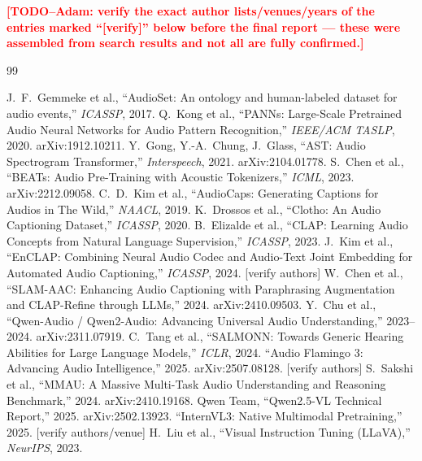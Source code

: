 \documentclass[11pt,a4paper]{article}
\newcommand{\TODO}[1]{\textcolor{red}{\textbf{[TODO--Adam: #1]}}}
\begin{document}
\noindent\TODO{verify the exact author lists/venues/years of the entries marked ``[verify]'' below before the final report --- these were assembled from search results and not all are fully confirmed.}\par\smallskip

\begin{thebibliography}{99}

 J.\ F.\ Gemmeke et al., ``AudioSet: An ontology and human-labeled dataset for audio events,'' \emph{ICASSP}, 2017.
 Q.\ Kong et al., ``PANNs: Large-Scale Pretrained Audio Neural Networks for Audio Pattern Recognition,'' \emph{IEEE/ACM TASLP}, 2020. arXiv:1912.10211.
 Y.\ Gong, Y.-A.\ Chung, J.\ Glass, ``AST: Audio Spectrogram Transformer,'' \emph{Interspeech}, 2021. arXiv:2104.01778.
 S.\ Chen et al., ``BEATs: Audio Pre-Training with Acoustic Tokenizers,'' \emph{ICML}, 2023. arXiv:2212.09058.
 C.\ D.\ Kim et al., ``AudioCaps: Generating Captions for Audios in The Wild,'' \emph{NAACL}, 2019.
 K.\ Drossos et al., ``Clotho: An Audio Captioning Dataset,'' \emph{ICASSP}, 2020.
 B.\ Elizalde et al., ``CLAP: Learning Audio Concepts from Natural Language Supervision,'' \emph{ICASSP}, 2023.
 J.\ Kim et al., ``EnCLAP: Combining Neural Audio Codec and Audio-Text Joint Embedding for Automated Audio Captioning,'' \emph{ICASSP}, 2024. [verify authors]
 W.\ Chen et al., ``SLAM-AAC: Enhancing Audio Captioning with Paraphrasing Augmentation and CLAP-Refine through LLMs,'' 2024. arXiv:2410.09503.
 Y.\ Chu et al., ``Qwen-Audio / Qwen2-Audio: Advancing Universal Audio Understanding,'' 2023--2024. arXiv:2311.07919.
 C.\ Tang et al., ``SALMONN: Towards Generic Hearing Abilities for Large Language Models,'' \emph{ICLR}, 2024.
 ``Audio Flamingo 3: Advancing Audio Intelligence,'' 2025. arXiv:2507.08128. [verify authors]
 S.\ Sakshi et al., ``MMAU: A Massive Multi-Task Audio Understanding and Reasoning Benchmark,'' 2024. arXiv:2410.19168.
 Qwen Team, ``Qwen2.5-VL Technical Report,'' 2025. arXiv:2502.13923.
 ``InternVL3: Native Multimodal Pretraining,'' 2025. [verify authors/venue]
 H.\ Liu et al., ``Visual Instruction Tuning (LLaVA),'' \emph{NeurIPS}, 2023.

\end{thebibliography}
\end{document}
